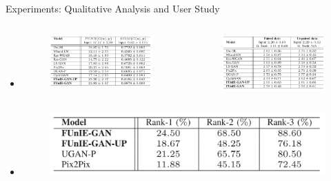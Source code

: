 \documentclass{cubeamer}
\begin{document}
\begin{frame}{Experiments: Qualitative Analysis and User Study}
    \begin{itemize}
        \item {}
        \begin{columns}
            \begin{column}{0.45\textwidth}
                \begin{figure}
                    \centering
                    \includegraphics[width=1.0\columnwidth]{figures/result-4.PNG}
                \end{figure}
            \end{column}
            \begin{column}{0.45\textwidth}
                \begin{figure}
                    \centering
                    \includegraphics[width=1.\columnwidth]{figures/result-5.PNG}
                \end{figure}
            \end{column}
        \end{columns}
        \item {}
        \begin{figure}
            \centering
            \includegraphics[width=0.5\columnwidth]{figures/result-6.PNG}
    \end{figure}
    \end{itemize}
\end{frame}
\end{document}
